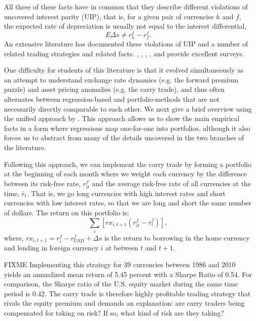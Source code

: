 \documentclass{ar-1col}
\begin{document}
All three of these facts have in common that they describe different violations of uncovered interest parity (UIP), that is, for a given pair of currencies $h$ and $f$, the expected rate of depreciation is usually not equal to the interest differential, $$E\Delta s \neq r^f_h-r^f_f .$$ An extensive literature has documented these violations of UIP and a number of related trading strategies and related facts. \citet{Hodrick1987}, \citet{FrootThaler1990}, \citet{Engel1996}, \citet{Lewis2011}, and \citet{Engel2014} provide excellent surveys.

One difficulty for students of this literature is that it evolved simultaneously as an attempt to understand exchange rate dynamics (e.g. the forward premium puzzle) and asset pricing anomalies (e.g. the carry trade), and thus often alternates between regression-based and portfolio-methods that are not necessarily directly comparable to each other. We next give a brief overview using the unified approach by \citet{HassanMano2019}. This approach allows us to show the main empirical facts in a form where regressions map one-for-one into portfolios, although it also forces us to abstract from many of the details uncovered in the two branches of the literature.

Following this approach, we can implement the carry trade by forming a portfolio at the beginning of each month where we weight each currency by the difference between its risk-free rate, $r^f_{it}$ and the average risk-free rate of all currencies at the time, $\bar{r}_t$. That is, we go long currencies with high interest rates and short currencies with low interest rates, so that we are long and short the same number of dollars. The return on this portfolio is:
\begin{equation}
  \label{eq_carry}
  \textstyle\sum_{i}\left[ rx_{i,t+1}\left( r^f_{it}-\overline{r}^f_{t}\right) \right] ,
\end{equation}%
where, $rx_{i,t+1}=r^f_i-r^f_{USD}+\Delta s$ is the return to borrowing in the home currency and lending in foreign currency $i$ at between $t$ and $t+1$.

FIXME Implementing this strategy for 39 currencies between 1986 and 2010 yields an annualized mean return of 5.45 percent with a Sharpe Ratio of 0.54. For comparison, the Sharpe ratio of the U.S. equity market during the same time period is 0.42. The carry trade is therefore highly profitable trading strategy that rivals the equity premium and demands an explanation: are carry traders being compensated for taking on risk? If so, what kind of risk are they taking?
\end{document}
